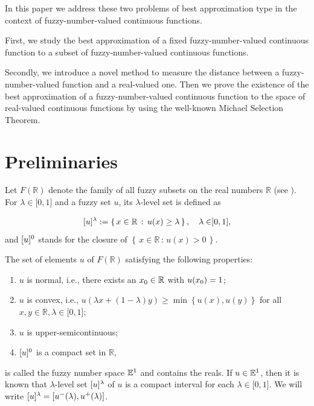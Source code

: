 \documentclass[12pt]{amsart}
\newcommand{\R}{{\mathbb{R}}}
\newcommand{\inter}{\mathopen [0,1\mathclose]}
\newcommand{\interu}{\mathopen [u\sp{-}(\lambda),
u\sp{+}(\lambda)\mathclose]}
\newcommand{\cj}[2]{\left \{\, #1\, : \, #2\, \right\}}
\newcommand{\fn}{\mathbb{E}\sp{1}}
\begin{document}
In this paper we address these two problems of best approximation type in the context of fuzzy-number-valued continuous functions.

First, we study the best approximation of a fixed fuzzy-number-valued continuous function to a subset of fuzzy-number-valued continuous functions.

Secondly, we introduce a novel method to measure the distance between a fuzzy-number-valued function and a real-valued one. Then we prove the existence of the best approximation of a fuzzy-number-valued continuous function to the space of real-valued continuous functions by using the well-known Michael Selection Theorem.



\section{Preliminaries}



Let $F(\R)$ denote the family of all fuzzy subsets on the real
numbers $\R$ (see \cite{DK2}). For $\lambda\in\inter$ and a fuzzy set $u$, its $\lambda$-level set
is defined as

$$
[u]\sp{\lambda}:=\cj{x\in\R}{u(x)\geq \lambda}, \quad
\lambda\in ]0,1],
$$
and $[u]\sp{0}$ stands for the closure of $\cj{x\in\R}{u(x)>0}$.


The set of elements $u$ of
$F(\R)$ satisfying the following properties:

\begin{enumerate}
 \item $u$ is normal, i.e., there exists an $x\sb{0}\in\R$ with $u(x\sb{0})=1$;

\item $u$ is convex, i.e., $u(\lambda x + (1-\lambda)y)\geq \min
\left\{u(x),u(y)\right\}$  for all $x,y\in \R, \lambda\in\inter$;

\item $u$ is upper-semicontinuous;

\item $[u]\sp{0}$ is a compact set in $\R$,
\end{enumerate}
is called the fuzzy number space $\fn$ and contains the reals. 
 If $u\in\fn$, then it is known that $\lambda$-level set
$[u]\sp{\lambda}$ of $u$ is a compact interval for each
$\lambda\in\inter$. We will write $[u]\sp{\lambda}=\interu$.  
\end{document}
